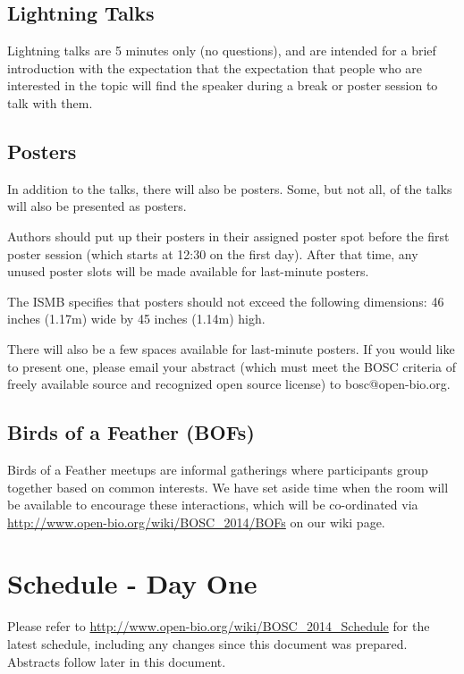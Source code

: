 \documentclass[12pt,oneside]{article}
\newcommand{\session}[3]{\clearpage\lhead{BOSC 2014 -- \textit{#1}\\#2\\#3}\newpage}
\begin{document}
\subsection*{Lightning Talks}
Lightning talks are 5 minutes only (no questions), and are intended for a
brief introduction with the expectation that the expectation that people
who are interested in the topic will find the speaker during a break or
poster session to talk with them.

\subsection*{Posters}

In addition to the talks, there will also be posters. Some, but not all, of the
talks will also be presented as posters.

Authors should put up their posters in their assigned poster spot before the
first poster session (which starts at 12:30 on the first day). After that time,
any unused poster slots will be made available for last-minute posters.

The ISMB specifies that posters should not exceed the following dimensions:
46 inches (1.17m) wide by 45 inches (1.14m) high.

There will also be a few spaces available for last-minute posters. If you would
like to present one, please email your abstract (which must meet the BOSC
criteria of freely available source and recognized open source license) to
bosc@open-bio.org.

\subsection*{Birds of a Feather (BOFs)}

Birds of a Feather meetups are informal gatherings where participants group
together based on common interests. We have set aside time when the room will
be available to encourage these interactions, which will be co-ordinated via
\url{http://www.open-bio.org/wiki/BOSC_2014/BOFs} on our wiki page.

\session{Schedule}{Day One, 9 July 2014}{}
\section*{Schedule - Day One}

Please refer to \url{http://www.open-bio.org/wiki/BOSC_2014_Schedule} for the
latest schedule, including any changes since this document was prepared.
Abstracts follow later in this document.
\end{document}
